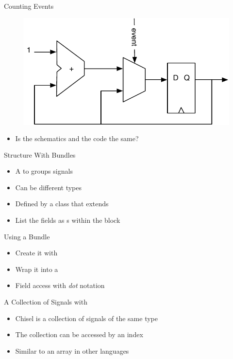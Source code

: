 \begin{frame}[fragile]{Counting Events}
\begin{figure}
  \includegraphics[scale=\scale]{../figures/event-counter}
\end{figure}
\begin{itemize}
\item Is the schematics and the code the same?
\end{itemize}
\end{frame}


\begin{frame}[fragile]{Structure With Bundles}
\begin{itemize}
\item A  to groups signals
\item Can be different types
\item Defined by a class that extends 
\item List the fields as s within the block
\end{itemize}
\end{frame}

\begin{frame}[fragile]{Using a Bundle}
\begin{itemize}
\item Create it with 
\item Wrap it into a 
\item Field access with \emph{dot} notation
\end{itemize}
\end{frame}

\begin{frame}[fragile]{A Collection of Signals with }
\begin{itemize}
\item Chisel  is a collection of signals of the same type
\item The collection can be accessed by an index
\item Similar to an array in other languages
\end{itemize}
\end{frame}

